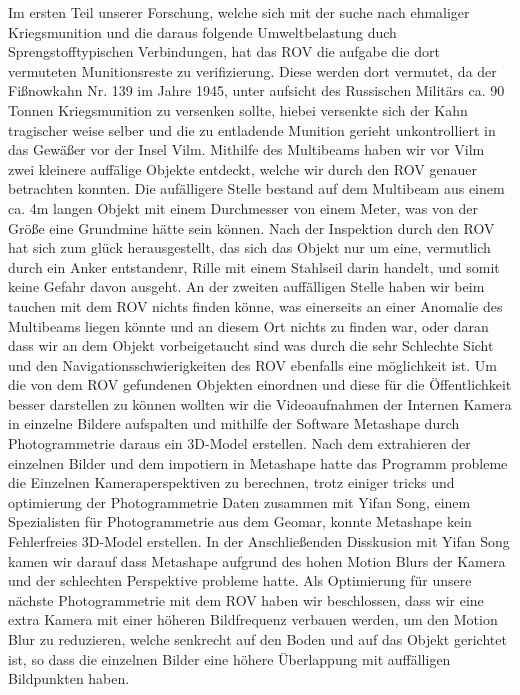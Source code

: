Im ersten Teil unserer Forschung, welche sich mit der suche nach ehmaliger Kriegsmunition und die daraus folgende Umweltbelastung duch Sprengstofftypischen Verbindungen,
 hat das ROV die aufgabe die dort vermuteten Munitionsreste zu verifizierung. Diese werden dort vermutet, da der Fißnowkahn Nr. 139 im Jahre 1945, unter aufsicht des Russischen Militärs ca. 90 Tonnen Kriegsmunition zu versenken sollte, hiebei versenkte sich der Kahn tragischer weise selber und die zu entladende Munition gerieht unkontrolliert in das Gewäßer vor der Insel Vilm.
Mithilfe des Multibeams haben wir vor Vilm zwei kleinere auffälige Objekte entdeckt, welche wir durch den ROV genauer betrachten konnten. Die aufälligere Stelle bestand auf dem Multibeam aus einem ca. 4m langen Objekt mit einem Durchmesser von einem Meter, was von der Größe eine Grundmine hätte sein können.
Nach der Inspektion durch den ROV hat sich zum glück herausgestellt, das sich das Objekt nur um eine, vermutlich durch ein Anker entstandenr, Rille mit einem Stahlseil darin handelt, und somit keine Gefahr davon ausgeht.
An der zweiten auffälligen Stelle haben wir beim tauchen mit dem ROV nichts finden könne, was einerseits an einer Anomalie des Multibeams liegen könnte und an diesem Ort nichts zu finden war, oder daran dass wir an dem Objekt vorbeigetaucht sind was durch die sehr Schlechte Sicht und den Navigationsschwierigkeiten des ROV ebenfalls eine möglichkeit ist.
Um die von dem ROV gefundenen Objekten einordnen und diese für die Öffentlichkeit besser darstellen zu können wollten wir die Videoaufnahmen der Internen Kamera in einzelne Bildere aufspalten und mithilfe der Software Metashape durch Photogrammetrie daraus ein 3D-Model erstellen. 
Nach dem extrahieren der einzelnen Bilder und dem impotiern in Metashape hatte das Programm probleme die Einzelnen Kameraperspektiven zu berechnen, trotz einiger tricks und optimierung der Photogrammetrie Daten zusammen mit Yifan Song, einem Spezialisten für Photogrammetrie aus dem Geomar, konnte Metashape kein Fehlerfreies 3D-Model erstellen.
In der Anschließenden Disskusion mit Yifan Song kamen wir darauf dass Metashape aufgrund des hohen Motion Blurs der Kamera und der schlechten Perspektive probleme hatte. 
Als Optimierung für unsere nächste Photogrammetrie mit dem ROV haben wir beschlossen, dass wir eine extra Kamera mit einer höheren Bildfrequenz verbauen werden, um den Motion Blur zu reduzieren, welche senkrecht auf den Boden und auf das Objekt gerichtet ist, so dass die einzelnen Bilder eine höhere Überlappung mit auffälligen Bildpunkten haben.
\\

